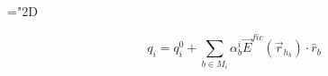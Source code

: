 \documentclass[24pt]{article}
\begin{document}
\mathchardef\mhyphen="2D


\begin{equation*}
  q_{i} = q_{i}^{0} + \sum_{b \in M_{i}} \alpha_{b}^{i}
  \vec{E}^{fic}\left(\vec{r}_{h_{b}}\right) \cdot \hat{r}_{b}
\end{equation*}
\end{document}
